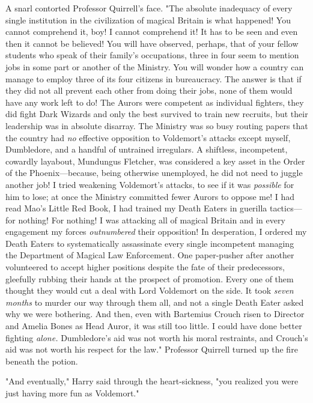 A snarl contorted Professor Quirrell's face. "The absolute inadequacy of every 
single institution in the civilization of magical Britain is what happened! You 
cannot comprehend it, boy! I cannot comprehend it! It has to be seen and even 
then it cannot be believed! You will have observed, perhaps, that of your 
fellow students who speak of their family's occupations, three in four seem to 
mention jobs in some part or another of the Ministry. You will wonder how a 
country can manage to employ three of its four citizens in bureaucracy. The 
answer is that if they did not all prevent each other from doing their jobs, 
none of them would have any work left to do! The Aurors were competent as 
individual fighters, they did fight Dark Wizards and only the best survived to 
train new recruits, but their leadership was in absolute disarray. The Ministry 
was so busy routing papers that the country had \emph{no} effective opposition 
to Voldemort's attacks except myself, Dumbledore, and a handful of untrained 
irregulars. A shiftless, incompetent, cowardly layabout, Mundungus Fletcher, 
was considered a key asset in the Order of the Phoenix---because, being 
otherwise unemployed, he did not need to juggle another job! I tried weakening 
Voldemort's attacks, to see if it was \emph{possible} for him to lose; at once 
the Ministry committed fewer Aurors to oppose me! I had read Mao's Little Red 
Book, I had trained my Death Eaters in guerilla tactics---for nothing! For 
nothing! I was attacking all of magical Britain and in every engagement my 
forces \emph{outnumbered} their opposition! In desperation, I ordered my Death 
Eaters to systematically assassinate every single incompetent managing the 
Department of Magical Law Enforcement. One paper-pusher after another 
volunteered to accept higher positions despite the fate of their predecessors, 
gleefully rubbing their hands at the prospect of promotion. Every one of them 
thought they would cut a deal with Lord Voldemort on the side. It took 
\emph{seven months} to murder our way through them all, and not a single Death 
Eater asked why we were bothering. And then, even with Bartemius Crouch risen 
to Director and Amelia Bones as Head Auror, it was still too little. I could 
have done better fighting \emph{alone.} Dumbledore's aid was not worth his 
moral restraints, and Crouch's aid was not worth his respect for the law." 
Professor Quirrell turned up the fire beneath the potion.

"And eventually," Harry said through the heart-sickness, "you realized you were 
just having more fun as Voldemort."

